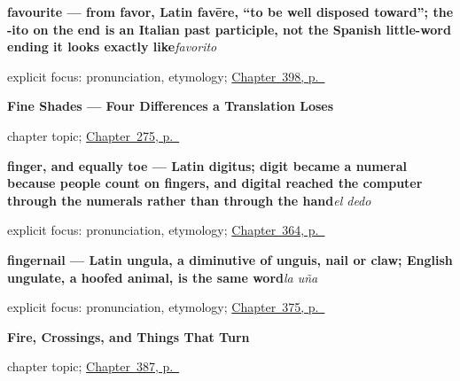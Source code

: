 \noindent\begin{minipage}[t]{\linewidth}
\raggedright
\textbf{favourite — from favor, Latin favēre, \textquotedblleft{}to be well disposed toward\textquotedblright{}; the -ito on the end is an Italian past participle, not the Spanish little-word ending it looks exactly like}\enspace\emph{favorito}\par
\footnotesize explicit focus: pronunciation, etymology; \hyperref[ch:importante-y-facil]{Chapter~398, p.~\pageref*{ch:importante-y-facil}}
\end{minipage}\par\smallskip

\noindent\begin{minipage}[t]{\linewidth}
\raggedright
\textbf{Fine Shades --- Four Differences a Translation Loses}\par
\footnotesize chapter topic; \hyperref[ch:matices]{Chapter~275, p.~\pageref*{ch:matices}}
\end{minipage}\par\smallskip

\noindent\begin{minipage}[t]{\linewidth}
\raggedright
\textbf{finger, and equally toe — Latin digitus; digit became a numeral because people count on fingers, and digital reached the computer through the numerals rather than through the hand}\enspace\emph{el dedo}\par
\footnotesize explicit focus: pronunciation, etymology; \hyperref[ch:la-mujer-y-la-cara]{Chapter~364, p.~\pageref*{ch:la-mujer-y-la-cara}}
\end{minipage}\par\smallskip

\noindent\begin{minipage}[t]{\linewidth}
\raggedright
\textbf{fingernail — Latin ungula, a diminutive of unguis, nail or claw; English ungulate, a hoofed animal, is the same word}\enspace\emph{la uña}\par
\footnotesize explicit focus: pronunciation, etymology; \hyperref[ch:la-una-y-el-labio]{Chapter~375, p.~\pageref*{ch:la-una-y-el-labio}}
\end{minipage}\par\smallskip

\noindent\begin{minipage}[t]{\linewidth}
\raggedright
\textbf{Fire, Crossings, and Things That Turn}\par
\footnotesize chapter topic; \hyperref[ch:quemar-y-cruzar]{Chapter~387, p.~\pageref*{ch:quemar-y-cruzar}}
\end{minipage}\par\smallskip

